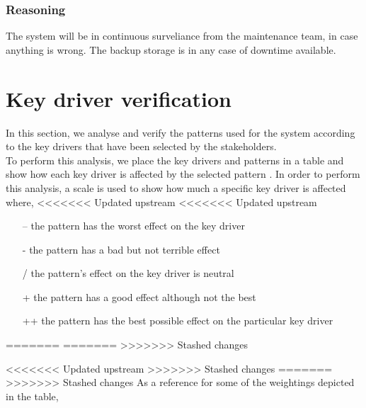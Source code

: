 \subsubsection{Reasoning}

The system will be in continuous surveliance from the maintenance team, in case anything is wrong. The backup storage is in any case of downtime available. 
\newpage


\section{Key driver verification}
In this section, we analyse and verify the patterns used for the system according to the key drivers that have been selected by the stakeholders.\\
To perform this analysis, we place the key drivers and patterns in a table and show how each key driver is affected by the selected pattern \cite{web:patterns-v-QAs} . In order to perform this analysis, a scale is used to show how much a specific key driver is affected where,
<<<<<<< Updated upstream
<<<<<<< Updated upstream
\begin{itemize}
  \item[--] the pattern has the worst effect on the key driver
  \item[-] the pattern has a bad but not terrible effect
  \item[/] the pattern's effect on the key driver is neutral
  \item[+] the pattern has a good effect although not the best  
  \item[++] the pattern has the best possible effect on the particular key driver
\end{itemize}
=======
=======
>>>>>>> Stashed changes

<<<<<<< Updated upstream
>>>>>>> Stashed changes
=======
>>>>>>> Stashed changes
As a reference for some of the weightings depicted in the table, 

